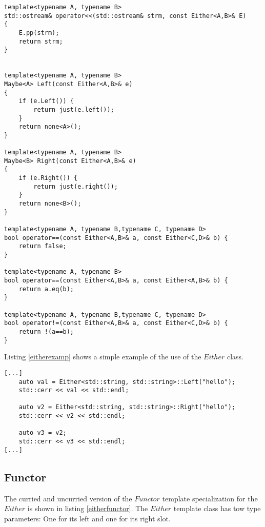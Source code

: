 \documentclass[12pt,fleqn]{article}
\begin{document}
%
%
%
\begin{minipage}{\linewidth}
\begin{lstlisting}[caption=Auxilliary functions for the Either type class, label=eitheraux]
template<typename A, typename B>
std::ostream& operator<<(std::ostream& strm, const Either<A,B>& E) 
{
	E.pp(strm);
	return strm;
}


template<typename A, typename B>
Maybe<A> Left(const Either<A,B>& e)
{
	if (e.Left()) {
		return just(e.left());
	}
	return none<A>();
}

template<typename A, typename B>
Maybe<B> Right(const Either<A,B>& e)
{
	if (e.Right()) {
		return just(e.right());
	}
	return none<B>();
}

template<typename A, typename B,typename C, typename D>
bool operator==(const Either<A,B>& a, const Either<C,D>& b) {
	return false;
}

template<typename A, typename B> 
bool operator==(const Either<A,B>& a, const Either<A,B>& b) {
	return a.eq(b);
}

template<typename A, typename B,typename C, typename D>
bool operator!=(const Either<A,B>& a, const Either<C,D>& b) {
	return !(a==b);
}

\end{lstlisting}
\end{minipage}
%
%
%
%

Listing \ref{eitherexamp} shows a simple example of the use of the $Either$ class.

%
%
\begin{minipage}{\linewidth}
\begin{lstlisting}[caption=Example of the use of Either,label=eitherexamp]
[...]	
	auto val = Either<std::string, std::string>::Left("hello");
	std::cerr << val << std::endl;

	auto v2 = Either<std::string, std::string>::Right("hello");
	std::cerr << v2 << std::endl;

	auto v3 = v2;
	std::cerr << v3 << std::endl;
[...]
\end{lstlisting}
\end{minipage}
%
%
%


\subsection{Functor}
%

The curried and uncurried version of the $Functor$ template specialization for the $Either$ is shown in listing \ref{eitherfunctor}.
The $Either$ template class has tow type parameters: One for its left and one for its right slot.
\end{document}
